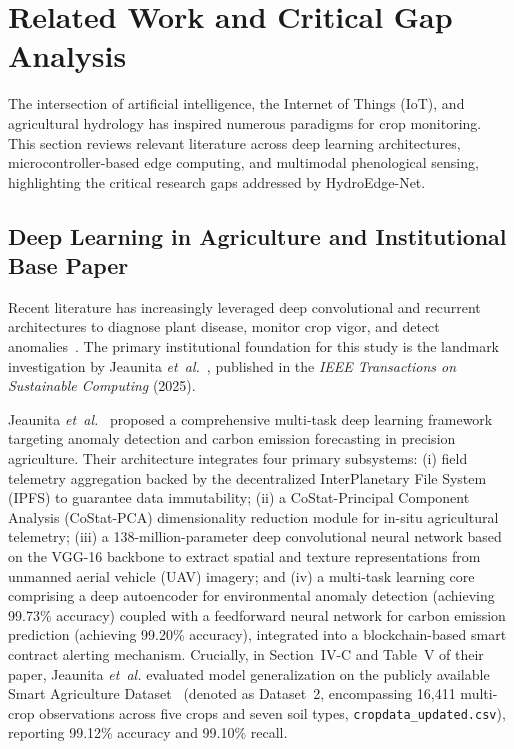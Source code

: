 \section{Related Work and Critical Gap Analysis}
\label{sec:related_work}

The intersection of artificial intelligence, the Internet of Things (IoT), and agricultural hydrology has inspired numerous paradigms for crop monitoring. This section reviews relevant literature across deep learning architectures, microcontroller-based edge computing, and multimodal phenological sensing, highlighting the critical research gaps addressed by HydroEdge-Net.

\subsection{Deep Learning in Agriculture and Institutional Base Paper}

Recent literature has increasingly leveraged deep convolutional and recurrent architectures to diagnose plant disease, monitor crop vigor, and detect anomalies~\cite{hughes2015open, sankararao2022pearlmillet, ahmad2024ai}. The primary institutional foundation for this study is the landmark investigation by Jeaunita \textit{et~al.}~\cite{jeaunita2025multitask}, published in the \textit{IEEE Transactions on Sustainable Computing} (2025). 

Jeaunita \textit{et~al.}~\cite{jeaunita2025multitask} proposed a comprehensive multi-task deep learning framework targeting anomaly detection and carbon emission forecasting in precision agriculture. Their architecture integrates four primary subsystems: (i) field telemetry aggregation backed by the decentralized InterPlanetary File System (IPFS) to guarantee data immutability; (ii) a CoStat-Principal Component Analysis (CoStat-PCA) dimensionality reduction module for in-situ agricultural telemetry; (iii) a 138-million-parameter deep convolutional neural network based on the VGG-16 backbone to extract spatial and texture representations from unmanned aerial vehicle (UAV) imagery; and (iv) a multi-task learning core comprising a deep autoencoder for environmental anomaly detection (achieving 99.73\% accuracy) coupled with a feedforward neural network for carbon emission prediction (achieving 99.20\% accuracy), integrated into a blockchain-based smart contract alerting mechanism. Crucially, in Section~IV-C and Table~V of their paper, Jeaunita \textit{et~al.} evaluated model generalization on the publicly available Smart Agriculture Dataset~\cite{gopidesi2024smartagri} (denoted as Dataset~2, encompassing 16,411 multi-crop observations across five crops and seven soil types, \texttt{cropdata\_updated.csv}), reporting 99.12\% accuracy and 99.10\% recall.

